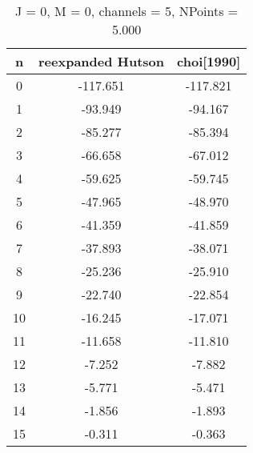 \documentclass[12pt]{article}
\begin{document}
\begin{table}[H]
    \begin{center}
    \caption{J = 0, M = 0, channels = 5, NPoints = 5.000}
    \begin{tabular}{ccc}
    \toprule[1.5pt]
    n & reexpanded Hutson & choi[1990] \\[1.5pt]
    \hline
        0 & -117.651 & -117.821 \\
        1 & -93.949 & -94.167 \\
        2 &  -85.277 & -85.394 \\
        3 &  -66.658 & -67.012 \\
        4 &  -59.625 & -59.745 \\
        5 &  -47.965 & -48.970 \\
        6 &  -41.359 & -41.859 \\
        7 &  -37.893 & -38.071 \\
        8 &  -25.236 & -25.910 \\
        9 &  -22.740 & -22.854 \\
       10 &  -16.245 & -17.071 \\
       11 &  -11.658 & -11.810 \\
       12 &   -7.252 & -7.882 \\
       13 &   -5.771 & -5.471 \\
       14 &   -1.856 & -1.893 \\
       15 &   -0.311 & -0.363 \\
    \bottomrule
\end{tabular}
\end{center}
\end{table}


\newpage
\end{document}
